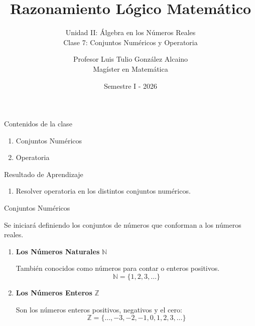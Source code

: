 \documentclass[10pt]{beamer}
\title[MAT-016]{Razonamiento Lógico Matemático}
\subtitle{Unidad II: Álgebra en los Números Reales\\
	Clase 7: Conjuntos Numéricos y Operatoria}
\author[]{Profesor Luis Tulio González Alcaino\\
	Magíster en Matemática}
\institute{Universidad Santo Tomás\\
	Departamento Ciencias Básicas - Talca}
\date{Semestre I - 2026}
\begin{document}
	
	\begin{frame}
		\titlepage
	\end{frame}
	
	\begin{frame}{Contenidos de la clase}
		\begin{enumerate}
			\item Conjuntos Numéricos
			\item Operatoria
		\end{enumerate}
	\end{frame}
	
	\begin{frame}{Resultado de Aprendizaje}
		\begin{enumerate}
			\item Resolver operatoria en los distintos conjuntos numéricos.
		\end{enumerate}
	\end{frame}
	
	\begin{frame}{Conjuntos Numéricos}
		\begin{block}{}
			Se iniciará definiendo los conjuntos de números que conforman a los números reales.
			
			\begin{enumerate}
				\item \textbf{Los Números Naturales} \(\mathbb{N}\)
				
				También conocidos como números para contar o enteros positivos.
				\[
				\mathbb{N}=\{1,2,3,\ldots\}
				\]
				
				\pause
				
				\item \textbf{Los Números Enteros} \(\mathbb{Z}\)
				
				Son los números enteros positivos, negativos y el cero:
				\[
				\mathbb{Z}=\{\ldots,-3,-2,-1,0,1,2,3,\ldots\}
				\]
			\end{enumerate}
		\end{block}
	\end{frame}
	
\end{document}
